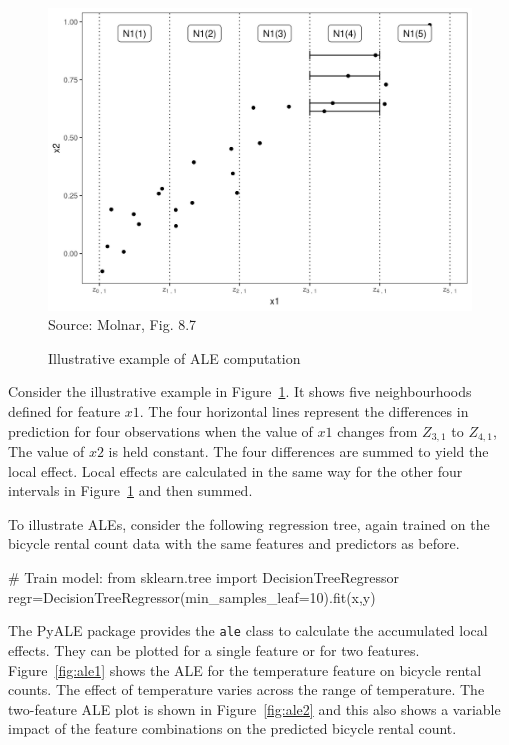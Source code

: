 \begin{figure}
\centering
\includegraphics[width=.75\textwidth]{molnar-8-7.jpeg} \\

\scriptsize Source: Molnar, Fig. 8.7
\caption{Illustrative example of ALE computation}
\label{fig:molnar87}
\end{figure}

Consider the illustrative example in Figure~\ref{fig:molnar87}. It shows five neighbourhoods defined for feature $x1$. The four horizontal lines represent the differences in prediction for four observations when the value of $x1$ changes from $Z_{3,1}$ to $Z_{4,1}$, The value of $x2$ is held constant. The four differences are summed to yield the local effect. Local effects are calculated in the same way for the other four intervals in Figure~\ref{fig:molnar87} and then summed. 

To illustrate ALEs, consider the following regression tree, again trained on the bicycle rental count data with the same features and predictors as before.

\begin{samepage}
\begin{pythoncode}
# Train model:
from sklearn.tree import DecisionTreeRegressor
regr=DecisionTreeRegressor(min_samples_leaf=10).fit(x,y)
\end{pythoncode}
\end{samepage}

The PyALE package provides the \texttt{ale} class to calculate the accumulated local effects. They can be plotted for a single feature or for two features. Figure~\ref{fig:ale1} shows the ALE for the temperature feature on bicycle rental counts. The effect of temperature varies across the range of temperature. The two-feature ALE plot is shown in Figure~\ref{fig:ale2} and this also shows a variable impact of the feature combinations on the predicted bicycle rental count. 

